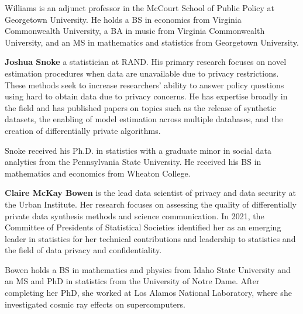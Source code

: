
Williams is an adjunct professor in the McCourt School of Public Policy at Georgetown University. He holds a BS in economics from Virginia Commonwealth University, a BA in music from Virginia Commonwealth University, and an MS in mathematics and statistics from Georgetown University.

\noindent\textbf{Joshua Snoke} a statistician at RAND. His primary research focuses on novel estimation procedures when data are unavailable due to privacy restrictions. These methods seek to increase researchers’ ability to answer policy questions using hard to obtain data due to privacy concerns. He has expertise broadly in the field and has published papers on topics such as the release of synthetic datasets, the enabling of model estimation across multiple databases, and the creation of differentially private algorithms.


Snoke received his Ph.D. in statistics with a graduate minor in social data analytics from the Pennsylvania State University. He received his BS in mathematics and economics from Wheaton College.

\noindent\textbf{Claire McKay Bowen} is the lead data scientist of privacy and data security at the Urban Institute. Her research focuses on assessing the quality of differentially private data synthesis methods and science communication. In 2021, the Committee of Presidents of Statistical Societies identified her as an emerging leader in statistics for her technical contributions and leadership to statistics and the field of data privacy and confidentiality.

Bowen holds a BS in mathematics and physics from Idaho State University and an MS and PhD in statistics from the University of Notre Dame. After completing her PhD, she worked at Los Alamos National Laboratory, where she investigated cosmic ray effects on supercomputers.
